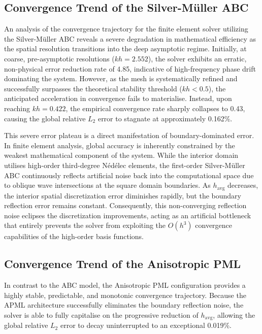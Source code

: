\documentclass[class=report, crop=false]{standalone}
\begin{document}
\subsection{Convergence Trend of the Silver-M\"{u}ller ABC}

An analysis of the convergence trajectory for the finite element solver utilizing the Silver-M\"{u}ller ABC reveals a severe degradation in mathematical efficiency as the spatial resolution transitions into the deep asymptotic regime. Initially, at coarse, pre-asymptotic resolutions ($kh = 2.552$), the solver exhibits an erratic, non-physical error reduction rate of 4.85, indicative of high-frequency phase drift dominating the system. However, as the mesh is systematically refined and successfully surpasses the theoretical stability threshold ($kh < 0.5$), the anticipated acceleration in convergence fails to materialise. Instead, upon reaching $kh = 0.422$, the empirical convergence rate sharply collapses to 0.43, causing the global relative $L_2$ error to stagnate at approximately 0.162\%.

\vspace{12pt}

This severe error plateau is a direct manifestation of boundary-dominated error. In finite element analysis, global accuracy is inherently constrained by the weakest mathematical component of the system. While the interior domain utilises high-order third-degree N\'{e}d\'{e}lec elements, the first-order Silver-M\"{u}ller ABC continuously reflects artificial noise back into the computational space due to oblique wave intersections at the square domain boundaries. As $h_{\text{avg}}$ decreases, the interior spatial discretization error diminishes rapidly, but the boundary reflection error remains constant. Consequently, this non-converging reflection noise eclipses the discretization improvements, acting as an artificial bottleneck that entirely prevents the solver from exploiting the $O(h^3)$ convergence capabilities of the high-order basis functions.

\subsection{Convergence Trend of the Anisotropic PML}

In contrast to the ABC model, the Anisotropic PML configuration provides a highly stable, predictable, and monotonic convergence trajectory. Because the APML architecture successfully eliminates the boundary reflection noise, the solver is able to fully capitalise on the progressive reduction of $h_{\text{avg}}$, allowing the global relative $L_2$ error to decay uninterrupted to an exceptional 0.019\%.
\end{document}
